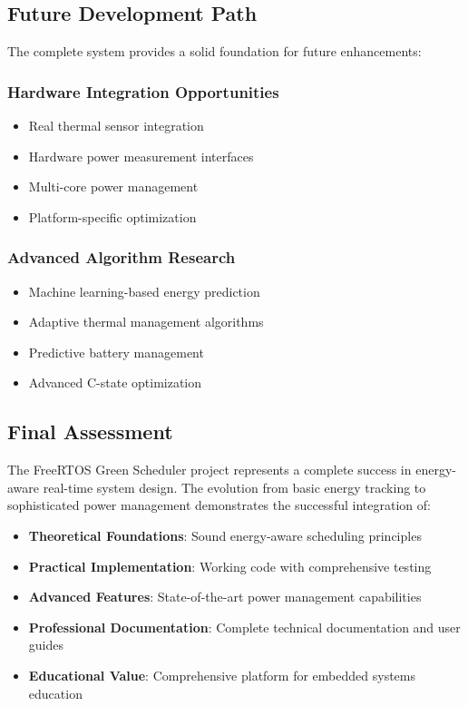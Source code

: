 \documentclass[11pt,a4paper]{article}
\begin{document}
\subsection{Future Development Path}
The complete system provides a solid foundation for future enhancements:

\subsubsection{Hardware Integration Opportunities}
\begin{itemize}
    \item Real thermal sensor integration
    \item Hardware power measurement interfaces
    \item Multi-core power management
    \item Platform-specific optimization
\end{itemize}

\subsubsection{Advanced Algorithm Research}
\begin{itemize}
    \item Machine learning-based energy prediction
    \item Adaptive thermal management algorithms
    \item Predictive battery management
    \item Advanced C-state optimization
\end{itemize}

\subsection{Final Assessment}
The FreeRTOS Green Scheduler project represents a complete success in energy-aware real-time system design. The evolution from basic energy tracking to sophisticated power management demonstrates the successful integration of:

\begin{itemize}
    \item \textbf{Theoretical Foundations}: Sound energy-aware scheduling principles
    \item \textbf{Practical Implementation}: Working code with comprehensive testing
    \item \textbf{Advanced Features}: State-of-the-art power management capabilities
    \item \textbf{Professional Documentation}: Complete technical documentation and user guides
    \item \textbf{Educational Value}: Comprehensive platform for embedded systems education
\end{itemize}
\end{document}
